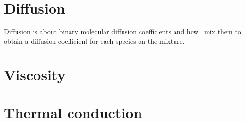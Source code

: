 \newpage
\section[transport_diffusion_graph]{Diffusion}
Diffusion is about binary molecular diffusion coefficients
and how \Antioch\ mix them to obtain a diffusion coefficient
for each species on the mixture.

\section[transport_viscosity_graph]{Viscosity}

\section[transport_therm_cond_graph]{Thermal conduction}

